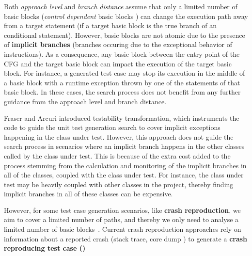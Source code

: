 Both \textit{approach level} and \textit{branch distance} assume that only a limited number of basic blocks (\ie \textit{control dependent} basic blocks \cite{Allen:1970:CFA:800028.808479}) can change the execution path away from a target statement (\eg if a target basic block is the true branch of an conditional statement).
However, basic blocks are not atomic due to the presence of \textbf{implicit branches} \cite{borba2010testing} (\ie branches occuring due to the exceptional behavior of instructions).
As a consequence, any basic block between the entry point of the CFG and the target basic block can impact the execution of the target basic block.
For instance, a generated test case may stop its execution in the middle of a basic block with a runtime exception thrown by one of the statements of that basic block. 
In these cases, the search process does not benefit from any further guidance from the approach level and branch distance.

Fraser and Arcuri \cite{fraser20151600} introduced testability transformation, which instruments the code to guide the unit test generation search to cover implicit exceptions happening in the class under test. However, this approach does not guide the search process in scenarios where an implicit branch happens in the other classes called by the class under test. This is because of the extra cost added to the process stemming from the calculation and monitoring of the implicit branches in all of the classes, coupled with the class under test.
For instance, the class under test may be heavily coupled with other classes in the project, thereby finding implicit branches in all of these classes can be expensive.

However, for some test case generation scenarios, like \textbf{crash reproduction}, we aim to cover a limited number of paths, and thereby we only need to analyse a limited number of basic blocks~\cite{Chen2015, Xuan2015, nayrolles2015jcharming, Rossler2013, Soltani2018a}. Current crash reproduction approaches rely on information about a reported crash (\eg stack trace, core dump \etc) to generate a \textbf{crash reproducing test case (\CRT)}

